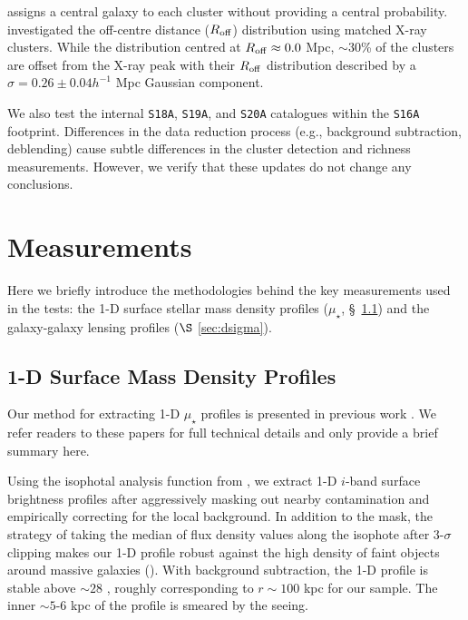 \documentclass[fleqn,usenatbib,useAMS]{mnras}
\begin{document}
\begin{CJK*}{UTF8}{gbsn}
    \camira{} assigns a central galaxy to each cluster without providing a central probability.
    \citet{Oguri2018} investigated the off-centre distance ($R_{\rm off}$) distribution using
    matched X-ray clusters.
    While the distribution centred at $R_{\rm off} \approx 0.0$ Mpc, $\sim 30$\% of the 
    clusters are offset from the X-ray peak with their $R_{\rm off}$ distribution described by a
    $\sigma=0.26 \pm 0.04 h^{-1}$ Mpc Gaussian component.

    We also test the internal \texttt{S18A}, \texttt{S19A}, and \texttt{S20A} \camira{} catalogues
    within the \texttt{S16A} footprint.
    Differences in the data reduction process (e.g., background subtraction, deblending)
    cause subtle differences in the cluster detection and richness measurements.
    However, we verify that these updates do not change any conclusions.

\section{Measurements}
    \label{sec:measure}

    Here we briefly introduce the methodologies behind the key measurements used in the \topn{}
    tests: the 1-D surface stellar mass density profiles ($\mu_{\star}$, \S\ \ref{sec:1d_prof})
    and the galaxy-galaxy lensing \dsigma{} profiles ($\S$ \ref{sec:dsigma}).

\subsection{1-D Surface Mass Density Profiles}
    \label{sec:1d_prof}

    Our method for extracting 1-D $\mu_{\star}$ profiles is presented in previous work
    \citep{Huang2018b, Huang2018c, Ardila2021}.
    We refer readers to these papers for full technical details and only provide a brief summary
    here.

    Using the \ellipse{} isophotal analysis function from \iraf{}, we extract 1-D $i$-band
    surface brightness profiles after aggressively masking out nearby contamination and
    empirically correcting for the local background.
    In addition to the mask, the strategy of taking the median of flux density values along the
    isophote after 3-$\sigma$ clipping makes our 1-D profile robust against the high density of
    faint objects around massive galaxies (\citealt{Ardila2021}).
    With background subtraction, the 1-D profile is stable above $\sim 28$ \smag{}, roughly
    corresponding to $r\sim 100$ kpc for our sample.
    The inner $\sim 5$-6 kpc of the profile is smeared by the seeing.


\end{CJK*}
\end{document}
